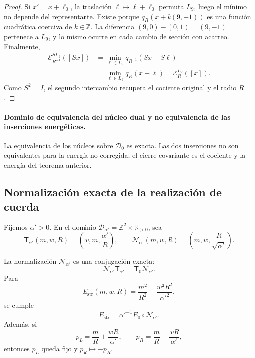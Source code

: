 \begin{proof}
Si \(x'=x+\ell_0\), la traslación
\(\ell\mapsto\ell+\ell_0\) permuta \(L_9\), luego el mínimo no depende del
representante. Existe porque \(q_R(x+k(9,-1))\) es una función cuadrática
coerciva de \(k\in\mathbb Z\). La diferencia
\((9,0)-(0,1)=(9,-1)\) pertenece a \(L_9\), y lo mismo ocurre en cada cambio
de sección con acarreo. Finalmente,
\[
\begin{aligned}
 \mathcal E_{R^{-1}}^{SL_9}([Sx])
 &=\min_{\ell\in L_9}q_{R^{-1}}(Sx+S\ell)\\
 &=\min_{\ell\in L_9}q_R(x+\ell)
 =\mathcal E_R^{L_9}([x]).
\end{aligned}
\]
Como \(S^2=I\), el segundo intercambio recupera el cociente original y el
radio \(R\).
\end{proof}

\paragraph{Dominio de equivalencia del núcleo dual y no equivalencia de las inserciones energéticas.}
La equivalencia de los núcleos sobre \(\mathscr D_0\) es exacta. Las dos
inserciones no son equivalentes para la energía no corregida; el cierre
covariante es el cociente y la energía del teorema anterior.

\subsection{Normalización exacta de la realización de cuerda}

Fijemos \(\alpha'>0\). En el dominio
\(\mathscr D_{\alpha'}=\mathbb Z^2\times\mathbb R_{>0}\), sea
\[
 \mathsf T_{\alpha'}(m,w,R)=\left(w,m,\frac{\alpha'}R\right),
 \qquad
 \mathcal N_{\alpha'}(m,w,R)
 =\left(m,w,\frac R{\sqrt{\alpha'}}\right).
\]

\begin{theorem}
\label{thm:cierre-vtm-normalizacion-alpha-t}
La normalización \(\mathcal N_{\alpha'}\) es una conjugación exacta:
\[
 \boxed{\mathcal N_{\alpha'}\mathsf T_{\alpha'}
 =\mathsf T_0\mathcal N_{\alpha'}.}
\]
Para
\[
 E_{\mathrm{str}}(m,w,R)
 =\frac{m^2}{R^2}+\frac{w^2R^2}{\alpha'^2},
\]
se cumple
\[
 E_{\mathrm{str}}
 =\alpha'^{-1}E_0\circ\mathcal N_{\alpha'}.
\]
Además, si
\[
 p_L=\frac mR+\frac{wR}{\alpha'},
 \qquad p_R=\frac mR-\frac{wR}{\alpha'},
\]
entonces \(p_L\) queda fijo y \(p_R\mapsto-p_R\).
\end{theorem}

